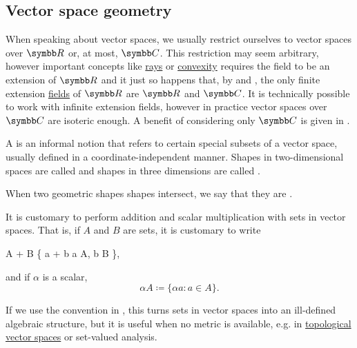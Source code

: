 \subsection{Vector space geometry}\label{subsec:vector_space_geometry}

\begin{remark}\label{remark:real_field_extensions}
  When speaking about vector spaces, we usually restrict ourselves to vector spaces over \( \BR \) or, at most, \( \BC \). This restriction may seem arbitrary, however important concepts like \hyperref[def:geometric_ray]{rays} or \hyperref[def:convex_set]{convexity} requires the field to be an extension of \( \BR \) and it just so happens that, by  and , the only finite extension \hyperref[def:field_extension]{fields} of \( \BR \) are \( \BR \) and \( \BC \). It is technically possible to work with infinite extension fields, however in practice vector spaces over \( \BC \) are isoteric enough. A benefit of considering only \( \BC \) is given in .
\end{remark}

\begin{definition}\label{def:geometric_shape}
  A  is an informal notion that refers to certain special subsets of a vector space, usually defined in a coordinate-independent manner. Shapes in two-dimensional spaces are called  and shapes in three dimensions are called .

  When two geometric shapes shapes intersect, we say that they are .
\end{definition}

\begin{remark}\label{remark:vector_space_set_operations}
  It is customary to perform addition and scalar multiplication with sets in vector spaces. That is, if \( A \) and \( B \) are sets, it is customary to write
  \begin{BreakableAlign*}
    A + B \coloneqq \{ a + b \colon a \in A, b \in B \},
  \end{BreakableAlign*}
  and if \( \alpha \) is a scalar,
  \begin{equation*}
    \alpha A \coloneqq \{ \alpha a \colon a \in A \}.
  \end{equation*}

  If we use the convention in , this turns sets in vector spaces into an ill-defined algebraic structure, but it is useful when no metric is available, e.g. in \hyperref[def:topological_vector_space]{topological vector spaces} or set-valued analysis.
\end{remark}

